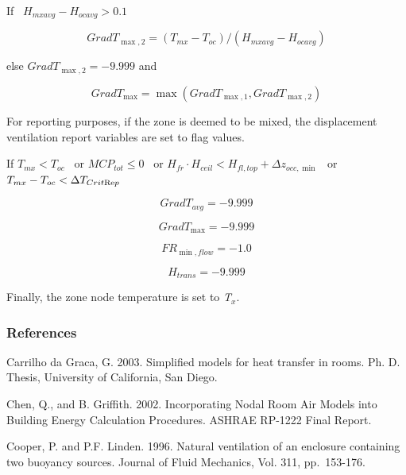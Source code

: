 If~ \({H_{mxavg}} - {H_{ocavg}} > 0.1\)

\begin{equation}
Grad{T_{\max ,2}} = ({T_{mx}} - {T_{oc}})/({H_{mxavg}} - {H_{ocavg}})
\end{equation}

else \(Grad{T_{\max ,2}} = - 9.999\) and

\begin{equation}
Grad{T_{\max }} = \max (Grad{T_{\max ,1}},Grad{T_{\max ,2}})
\end{equation}

For reporting purposes, if the zone is deemed to be mixed, the displacement ventilation report variables are set to flag values.

If \({T_{mx}} < {T_{oc}}\) ~or \(MC{P_{tot}} \le 0\) ~or \({H_{fr}} \cdot {H_{ceil}} < {H_{fl,top}} + \Delta {z_{occ,\min }}\) ~or \({T_{mx}} - {T_{oc}} < \Delta {T_{Crit{\mathop{\rm Re}\nolimits} p}}\)

\begin{equation}
Grad{T_{avg}} =  - 9.999
\end{equation}

\begin{equation}
Grad{T_{\max }} =  - 9.999
\end{equation}

\begin{equation}
F{R_{\min ,flow}} =  - 1.0
\end{equation}

\begin{equation}
{H_{trans}} =  - 9.999
\end{equation}

Finally, the zone node temperature is set to \emph{T\(_{x}\)}.

\subsubsection{References}\label{references-2-000}

Carrilho da Graca, G. 2003. Simplified models for heat transfer in rooms. Ph. D. Thesis, University of California, San Diego.

Chen, Q., and B. Griffith. 2002. Incorporating Nodal Room Air Models into Building Energy Calculation Procedures. ASHRAE RP-1222 Final Report.

Cooper, P. and P.F. Linden. 1996. Natural ventilation of an enclosure containing two buoyancy sources. Journal of Fluid Mechanics, Vol. 311, pp.~153-176.

